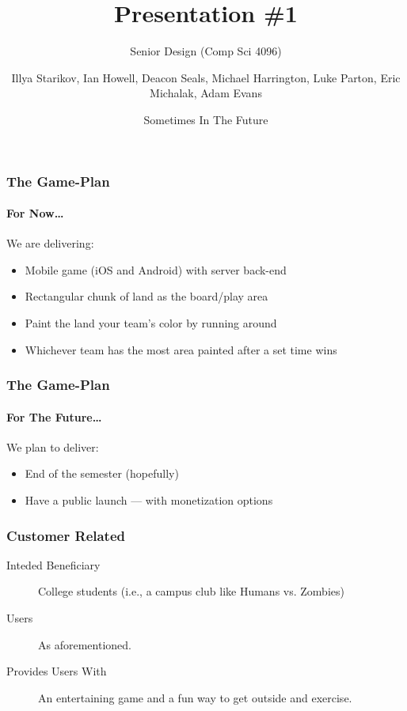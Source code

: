 \documentclass[xclolor=dvipsnames]{beamer}            %
\title{Presentation \#1}
\subtitle{Senior Design (Comp Sci 4096)}
\author{Illya Starikov, Ian Howell, Deacon Seals, Michael Harrington, Luke Parton, Eric Michalak, Adam Evans}
\date{Sometimes In The Future}
\institute{Missouri University of Science and Technology}
\begin{document}
\begin{darkframes}
    \maketitle


    \begin{frame}
        \frametitle{The Game-Plan}
        \framesubtitle{For Now\ldots}
        We are delivering:

        \begin{itemize}
            \item Mobile game (iOS and Android) with server back-end
            \item Rectangular chunk of land as the board/play area
            \item Paint the land your team's color by running around
            \item Whichever team has the most area painted after a set time wins
        \end{itemize}

    \end{frame}


    \begin{frame}
        \frametitle{The Game-Plan}
        \framesubtitle{For The Future\ldots}

        We plan to deliver:

        \begin{itemize}
            \item End of the semester (hopefully)
            \item Have a public launch --- with monetization options
        \end{itemize}

    \end{frame}


    \begin{frame}
        \frametitle{Customer Related}

        \begin{description}
            \item[Inteded Beneficiary] College students (i.e., a campus club like Humans vs. Zombies)
            \item[\phantom{Placeholder---} Users]           As aforementioned.
            \item[Provides Users With] An entertaining game and a fun way to get outside and exercise.
        \end{description}


\end{frame}
\end{darkframes}
\end{document}

